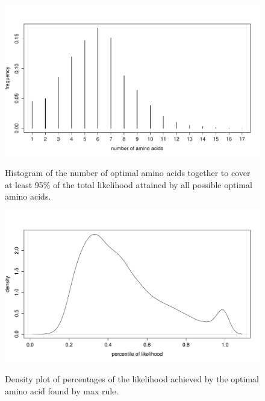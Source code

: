 \documentclass[13pt]{article}
\begin{document}
\begin{figure}[h]
\caption{Histogram of the number of optimal amino acids together to cover at least 95\% of the total likelihood attained by all possible optimal amino acids.}
\centering
\includegraphics[width=\textwidth]{AAnum.pdf}
\label{fig:AAnum}
\end{figure}


\begin{figure}[h]
\caption{Density plot of percentages of the likelihood achieved by the optimal amino acid found by max rule.}
\centering
\includegraphics[width=\textwidth]{percentile.pdf}
\label{fig:percentile}
\end{figure}


\end{document}
